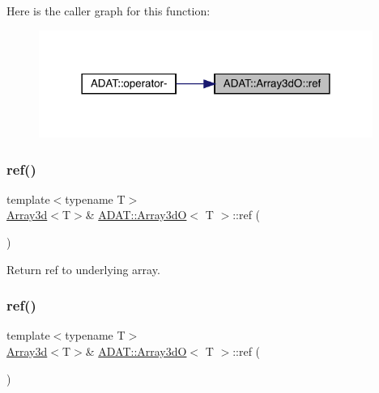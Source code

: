 Here is the caller graph for this function\+:\nopagebreak
\begin{figure}[H]
\begin{center}
\leavevmode
\includegraphics[width=309pt]{dd/da8/classADAT_1_1Array3dO_a7ad48358af907cbaf3cf50fad298a088_icgraph}
\end{center}
\end{figure}
\mbox{\label{classADAT_1_1Array3dO_ad56a8ea2aac56eba9b8b74af06e79970}} 
\subsubsection{\texorpdfstring{ref()}{ref()}\hspace{0.1cm}{\footnotesize\ttfamily [3/4]}}
{\footnotesize\ttfamily template$<$typename T$>$ \\
\mbox{\hyperlink{classXMLArray_1_1Array3d}{Array3d}}$<$T$>$\& \mbox{\hyperlink{classADAT_1_1Array3dO}{A\+D\+A\+T\+::\+Array3dO}}$<$ T $>$\+::ref (\begin{DoxyParamCaption}{ }\end{DoxyParamCaption})\hspace{0.3cm}{\ttfamily [inline]}}



Return ref to underlying array. 

\mbox{\label{classADAT_1_1Array3dO_ad56a8ea2aac56eba9b8b74af06e79970}} 
\subsubsection{\texorpdfstring{ref()}{ref()}\hspace{0.1cm}{\footnotesize\ttfamily [4/4]}}
{\footnotesize\ttfamily template$<$typename T$>$ \\
\mbox{\hyperlink{classXMLArray_1_1Array3d}{Array3d}}$<$T$>$\& \mbox{\hyperlink{classADAT_1_1Array3dO}{A\+D\+A\+T\+::\+Array3dO}}$<$ T $>$\+::ref (\begin{DoxyParamCaption}{ }\end{DoxyParamCaption})\hspace{0.3cm}{\ttfamily [inline]}}



